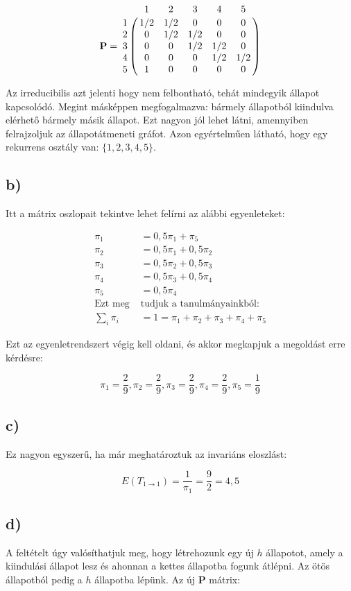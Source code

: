 \documentclass[a4paper,12pt]{article}
\begin{document}
\[
\mathbf{P} = 
\bordermatrix{
~	&	1	&	2	&	3	&	4	&	5	\cr
1	&	1/2	&	1/2	&	0	&	0	&	0	\cr
2	&	0	&	1/2	&	1/2	&	0	&	0	\cr
3	&	0	&	0	&	1/2	&	1/2	&	0	\cr
4	&	0	&	0	&	0	&	1/2	&	1/2	\cr
5	&	1	&	0	&	0	&	0	&	0}
\]

Az irreducibilis azt jelenti hogy nem felbontható, tehát mindegyik 
állapot kapcsolódó. Megint másképpen megfogalmazva: bármely 
állapotból kiindulva elérhető bármely másik állapot. Ezt nagyon jól
lehet látni, amennyiben felrajzoljuk az állapotátmeneti gráfot.
Azon egyértelműen látható, hogy egy rekurrens osztály van:
$\{1, 2, 3, 4, 5\}$.

\subsection*{b)}
Itt a mátrix oszlopait tekintve lehet felírni az alábbi egyenleteket:

\begin{align*}
\pi_1 &= 0,5 \pi_1 + \pi_5 \\
\pi_2 &= 0,5 \pi_1 + 0,5 \pi_2 \\
\pi_3 &= 0,5 \pi_2 + 0,5 \pi_3 \\
\pi_4 &= 0,5 \pi_3 + 0,5 \pi_4 \\
\pi_5 &= 0,5 \pi_4 \\
\text{Ezt meg } &\text{tudjuk a tanulmányainkból:} \\
\sum_{i} \pi_i &= 1 = \pi_1 + \pi_2 + \pi_3 + \pi_4 + \pi_5
\end{align*}

Ezt az egyenletrendszert végig kell oldani, és akkor megkapjuk a
megoldást erre kérdésre:

\[
\pi_1 = \frac{2}{9},
\pi_2 = \frac{2}{9},
\pi_3 = \frac{2}{9},
\pi_4 = \frac{2}{9},
\pi_5 = \frac{1}{9}
\]

\subsection*{c)}
Ez nagyon egyszerű, ha már meghatároztuk az invariáns eloszlást:

\[
E(T_{1\to1}) = \frac{1}{\pi_1} = \frac{9}{2} = 4,5
\]

\subsection*{d)}
A feltételt úgy valósíthatjuk meg, hogy létrehozunk egy új $h$
állapotot, amely a kiindulási állapot lesz és ahonnan a kettes
állapotba fogunk átlépni. Az ötös állapotból pedig a $h$ állapotba 
lépünk. Az új $\mathbf{P}$ mátrix:
\end{document}
